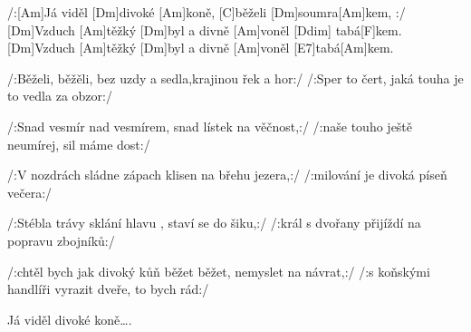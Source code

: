 
/:[Am]Já viděl [Dm]divoké [Am]koně, [C]běželi [Dm]soumra[Am]kem, :/
[Dm]Vzduch [Am]těžký [Dm]byl a divně [Am]voněl [Ddim] tabá[F]kem.
[Dm]Vzduch [Am]těžký [Dm]byl a divně [Am]voněl [E7]tabá[Am]kem.

/:Běželi, běžěli, bez uzdy a sedla,krajinou řek a hor:/
/:Sper to čert, jaká touha je to vedla za obzor:/

/:Snad vesmír nad vesmírem, snad lístek na věčnost,:/
/:naše touho ještě neumírej, sil máme dost:/

/:V nozdrách sládne zápach klisen na břehu jezera,:/
/:milování je divoká píseň večera:/

/:Stébla trávy sklání hlavu , staví se do šiku,:/
/:král s dvořany přijíždí na popravu zbojníků:/

/:chtěl bych jak divoký kůň běžet běžet, nemyslet na návrat,:/
/:s koňskými handlíři vyrazit dveře, to bych rád:/

Já viděl divoké koně….